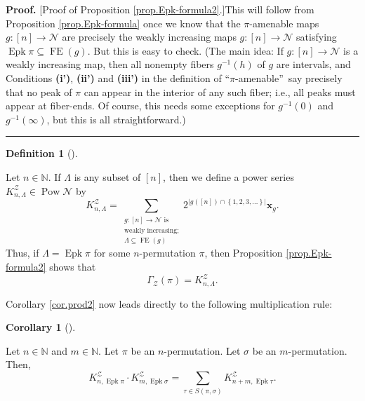 \documentclass[numbers=enddot,12pt,final,onecolumn,notitlepage]{scrartcl}%
\theoremstyle{definition}
\newtheorem{defi}[theo]{Definition}
\newenvironment{definition}[1][]
{\begin{defi}[#1]\begin{leftbar}}
{\end{leftbar}\end{defi}}
\newtheorem{coro}[theo]{Corollary}
\newenvironment{corollary}[1][]
{\begin{coro}[#1]\begin{leftbar}}
{\end{leftbar}\end{coro}}
\newenvironment{proof}[1][Proof]{\noindent\textbf{#1.} }{\ \rule{0.5em}{0.5em}}
\let\sumnonlimits\sum
\renewcommand{\sum}{\sumnonlimits\limits}
\begin{document}
\begin{proof}
[Proof of Proposition \ref{prop.Epk-formula2}.]This will follow from
Proposition \ref{prop.Epk-formula} once we know that the $\pi$-amenable maps
$g:\left[  n\right]  \rightarrow\mathcal{N}$ are precisely the weakly
increasing maps $g:\left[  n\right]  \rightarrow\mathcal{N}$ satisfying
$\operatorname*{Epk}\pi\subseteq\operatorname*{FE}\left(  g\right)  $. But
this is easy to check. (The main idea: If $g:\left[  n\right]  \rightarrow
\mathcal{N}$ is a weakly increasing map, then all nonempty fibers
$g^{-1}\left(  h\right)  $ of $g$ are intervals, and Conditions \textbf{(i')},
\textbf{(ii')} and \textbf{(iii')} in the definition of \textquotedblleft$\pi
$-amenable\textquotedblright\ say precisely that no peak of $\pi$ can appear
in the interior of any such fiber; i.e., all peaks must appear at fiber-ends.
Of course, this needs some exceptions for $g^{-1}\left(  0\right)  $ and
$g^{-1}\left(  \infty\right)  $, but this is all straightforward.)
\end{proof}

\begin{definition}
\label{def.KnL}Let $n\in\mathbb{N}$. If $\Lambda$ is any subset of $\left[
n\right]  $, then we define a power series $K_{n,\Lambda}^{\mathcal{Z}}%
\in\operatorname*{Pow}\mathcal{N}$ by%
\begin{equation}
K_{n,\Lambda}^{\mathcal{Z}}=\sum_{\substack{g:\left[  n\right]  \rightarrow
\mathcal{N}\text{ is}\\\text{weakly increasing;}\\\Lambda\subseteq
\operatorname*{FE}\left(  g\right)  }}2^{\left\vert g\left(  \left[  n\right]
\right)  \cap\left\{  1,2,3,\ldots\right\}  \right\vert }\mathbf{x}_{g}.
\label{eq.def.KnL.1}%
\end{equation}
Thus, if $\Lambda=\operatorname*{Epk}\pi$ for some $n$-permutation $\pi$, then
Proposition \ref{prop.Epk-formula2} shows that%
\begin{equation}
\Gamma_{\mathcal{Z}}\left(  \pi\right)  =K_{n,\Lambda}^{\mathcal{Z}}.
\label{eq.def.KnL.2}%
\end{equation}

\end{definition}

Corollary \ref{cor.prod2} now leads directly to the following multiplication rule:

\begin{corollary}
\label{cor.KnEpk-prodrule}Let $n\in\mathbb{N}$ and $m\in\mathbb{N}$. Let $\pi$
be an $n$-permutation. Let $\sigma$ be an $m$-permutation. Then,%
\[
K_{n,\operatorname*{Epk}\pi}^{\mathcal{Z}}\cdot K_{m,\operatorname*{Epk}%
\sigma}^{\mathcal{Z}}=\sum_{\tau\in S\left(  \pi,\sigma\right)  }%
K_{n+m,\operatorname*{Epk}\tau}^{\mathcal{Z}}.
\]

\end{corollary}
\end{document}

